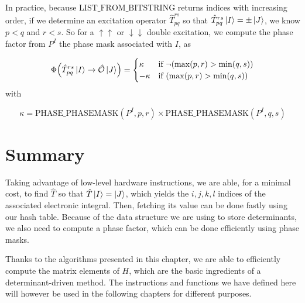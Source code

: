 \documentclass[./thesis.tex]{subfiles}
\begin{document}
In practice, because $\text{LIST\_FROM\_BITSTRING}$ returns indices with increasing order, if we determine an excitation operator $\hat T_{pq}^{rs}$ so that $\hat T_{pq}^{rs} \ket I = \pm \ket J$, we know $p<q$ and $r<s$. So for a $\uparrow \uparrow$ or $\downarrow \downarrow$ double excitation, we compute the phase factor from $P^I$ the phase mask associated with $I$, as



\begin{align}
{\Phi \qty(\hat T_{pq}^{rs} \ket I \rightarrow {\hat{\mathcal{O}}}\ket J)} = 
\begin{cases}
\kappa & \text{if } \neg \qty( \max(p,r) > \min(q,s) ) \\
-\kappa & \text{if } \qty( \max(p,r) > \min(q,s) )
\end{cases}
\end{align}
with 

\begin{equation}
\kappa = \text{PHASE\_PHASEMASK}(P^I, p,r) \times \text{PHASE\_PHASEMASK}(P^I, q,s)
\end{equation}
\section{Summary}



Taking advantage of low-level hardware instructions, we are able, for a minimal cost, to find $\hat T$ so that $\hat T \ket I = \ket J$, which yields the $i,j,k,l$ indices of the associated electronic integral. Then, fetching its value can be done fastly using our hash table.
Because of the data structure we are using to store determinants, we also need to compute a phase factor, which can be done efficiently using phase masks. 

Thanks to the algorithms presented in this chapter, we are able to efficiently compute the matrix elements of $H$, which are the basic ingredients of a determinant-driven method. The instructions and functions we have defined here will however be used in the following chapters for different purposes.
\end{document}
